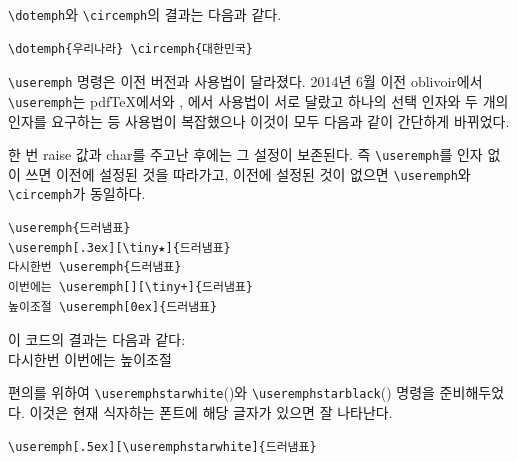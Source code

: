 \documentclass[
	12pt,
	a4paper,
	kosection,
	footnote,
	microtype,
	figtabcapt,
]{oblivoir}
\def\cs#1{\texttt{\textbackslash #1}}
\begin{document}
\cs{dotemph}와 \cs{circemph}의 결과는 다음과 같다.

\medskip

\noindent\begin{minipage}{.45\textwidth}
\begin{verbatim}
\dotemph{우리나라} \circemph{대한민국}
\end{verbatim}
\end{minipage}\hfill
\begin{minipage}{.45\textwidth}
 
\end{minipage}

\medskip

\cs{useremph} 명령은 이전 버전과 사용법이 달라졌다. 2014년 6월 이전 oblivoir에서
\cs{useremph}는 pdf\TeX 에서와 \XeTeX, \LuaTeX 에서 사용법이 서로 달랐고 
하나의 선택 인자와 두 개의 인자를 요구하는 등 사용법이 복잡했으나 이것이 모두 다음과 같이
간단하게 바뀌었다.
\begin{boxedverbatim}
\end{boxedverbatim}
한 번 raise 값과 char를 주고난 후에는 그 설정이 보존된다. 즉 \cs{useremph}를
인자 없이 쓰면 이전에 설정된 것을 따라가고, 이전에 설정된 것이 없으면 \cs{useremph}와
\cs{circemph}가 동일하다.

\begin{verbatim}
\useremph{드러냄표}
\useremph[.3ex][\tiny★]{드러냄표}
다시한번 \useremph{드러냄표}
이번에는 \useremph[][\tiny+]{드러냄표}
높이조절 \useremph[0ex]{드러냄표}
\end{verbatim}

이 코드의 결과는 다음과 같다:\\
 다시한번 
이번에는 
높이조절 

\medskip

편의를 위하여 \cs{useremphstarwhite}({\useremphstarwhite})와 \cs{useremphstarblack}({\useremphstarblack})
명령을 준비해두었다. 이것은 현재 식자하는 폰트에 해당 글자가 있으면 잘 나타난다.

\medskip

\noindent\begin{minipage}{.7\textwidth}
\begin{verbatim}
\useremph[.5ex][\useremphstarwhite]{드러냄표}
\end{verbatim}
\end{minipage}\hfill
\begin{minipage}{.28\textwidth}
\end{minipage}
\end{document}
